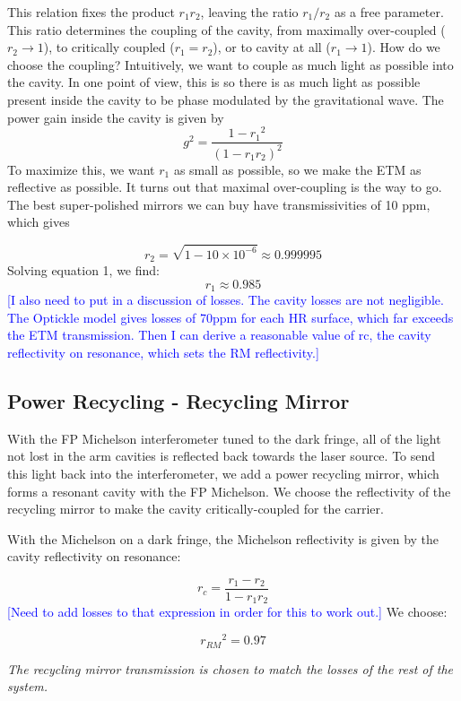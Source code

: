 This relation fixes the product $r_{1}r_{2}$, leaving the ratio $r_{1}/r_{2}$
as a free parameter. This ratio determines the coupling of the cavity,
from maximally over-coupled ($r_{2}\rightarrow1$), to critically
coupled ($r_{1}=r_{2}$), or to cavity at all ($r_{1}\rightarrow1$).
How do we choose the coupling? Intuitively, we want to couple as much
light as possible into the cavity. In one point of view, this is so
there is as much light as possible present inside the cavity to be
phase modulated by the gravitational wave. The power gain inside the
cavity is given by
\[
g^{2}=\frac{1-r_{1}{}^{2}}{\left(1-r_{1}r_{2}\right)^{2}}
\]
To maximize this, we want $r_{1}$ as small as possible, so we make
the ETM as reflective as possible. It turns out that maximal over-coupling
is the way to go. The best super-polished mirrors we can buy have
transmissivities of 10 ppm, which gives

\[
r_{2}=\sqrt{{1-10\times10^{-6}}}\approx0.999995
\]
Solving equation 1, we find:
\[
r_{1}\approx0.985
\]
\textcolor{blue}{{[}I also need to put in a discussion of losses.
The cavity losses are not negligible. The Optickle model gives losses
of 70ppm for each HR surface, which far exceeds the ETM transmission.
Then I can derive a reasonable value of rc, the cavity reflectivity
on resonance, which sets the RM reflectivity.{]}}


\subsection*{Power Recycling - Recycling Mirror}

With the FP Michelson interferometer tuned to the dark fringe, all
of the light not lost in the arm cavities is reflected back towards
the laser source. To send this light back into the interferometer,
we add a power recycling mirror, which forms a resonant cavity with
the FP Michelson. We choose the reflectivity of the recycling mirror
to make the cavity critically-coupled for the carrier. 

With the Michelson on a dark fringe, the Michelson reflectivity is
given by the cavity reflectivity on resonance:

\[
r_{c}=\frac{r_{1}-r_{2}}{1-r_{1}r_{2}}
\]
\textcolor{blue}{{[}Need to add losses to that expression in order
for this to work out.{]} }We choose:

\[
r_{RM}{}^{2}=0.97
\]


\emph{The recycling mirror transmission is chosen to match the losses
of the rest of the system.}


